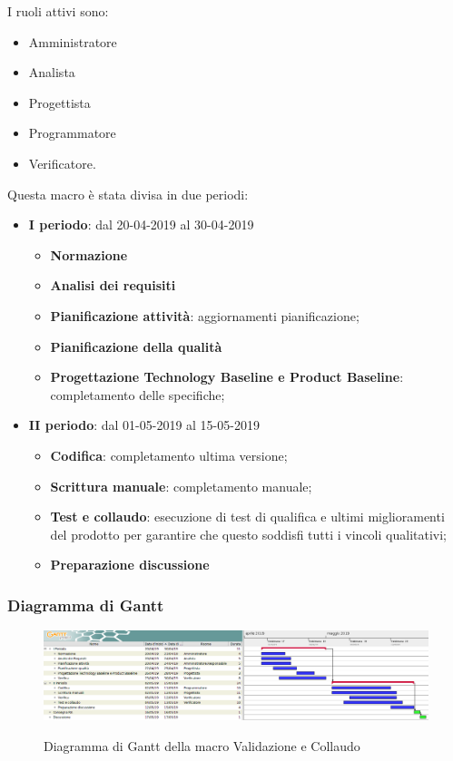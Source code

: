         I ruoli attivi sono: 
        \begin{itemize}
            \item Amministratore
            \item Analista
            \item Progettista
            \item Programmatore
            \item Verificatore.
        \end{itemize}
        Questa macro è stata divisa in due periodi:
		\begin{itemize}
			\item \textbf{I periodo}: dal 20-04-2019 al 30-04-2019
			\begin{itemize}
    	        \item \textbf{Normazione}
    	        \item \textbf{Analisi dei requisiti}
    	        \item \textbf{Pianificazione attività}: aggiornamenti pianificazione;
    	        \item \textbf{Pianificazione della qualità}
    	        \item \textbf{Progettazione Technology Baseline e Product Baseline}: completamento delle specifiche;
        	\end{itemize}
			\item \textbf{II periodo}: dal 01-05-2019 al 15-05-2019
			\begin{itemize}
    	        \item \textbf{Codifica}: completamento ultima versione;
    	        \item \textbf{Scrittura manuale}: completamento manuale;
    	        \item \textbf{Test e collaudo}: esecuzione di test di qualifica e ultimi miglioramenti del prodotto per
    	        garantire che questo soddisfi tutti i vincoli qualitativi;
    	        \item \textbf{Preparazione discussione}
        	\end{itemize}
		\end{itemize}
        
        \begin{landscape}
			\subsubsection{Diagramma di Gantt}        
			\begin{figure}[H]
					\centering
					\includegraphics[scale=0.44]{img/Validazione_e_collaudo.png}\\
					\caption{Diagramma di Gantt della macro Validazione e Collaudo}
			\end{figure}
		\end{landscape}
		\newpage
